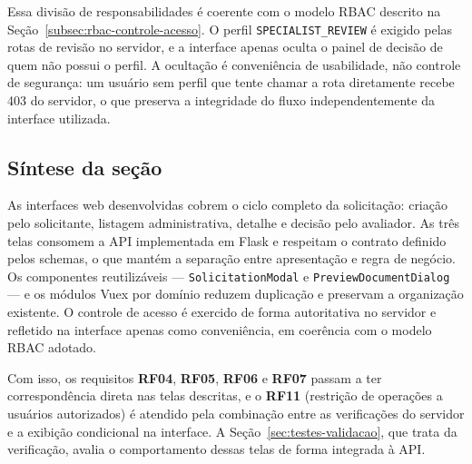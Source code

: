 Essa divisão de responsabilidades é coerente com o modelo RBAC descrito na Seção~\ref{subsec:rbac-controle-acesso}. O perfil
\texttt{SPECIALIST\_REVIEW} é exigido pelas rotas de revisão no servidor, e a interface apenas
oculta o painel de decisão de quem não possui o perfil. A ocultação é conveniência de
usabilidade, não controle de segurança: um usuário sem perfil que tente chamar a rota
diretamente recebe 403 do servidor, o que preserva a integridade do fluxo independentemente da
interface utilizada.

\subsection{Síntese da seção}



As interfaces web desenvolvidas cobrem o ciclo completo da solicitação: criação pelo
solicitante, listagem administrativa, detalhe e decisão pelo avaliador. As três telas consomem a
API implementada em Flask e respeitam o contrato definido pelos schemas, o que mantém a
separação entre apresentação e regra de negócio. Os componentes reutilizáveis ---
\texttt{SolicitationModal} e \texttt{PreviewDocumentDialog} --- e os módulos Vuex por domínio
reduzem duplicação e preservam a organização existente. O controle de acesso é exercido de forma
autoritativa no servidor e refletido na interface apenas como conveniência, em coerência com o
modelo RBAC adotado.

Com isso, os requisitos \textbf{RF04}, \textbf{RF05}, \textbf{RF06} e \textbf{RF07} passam a ter correspondência direta nas
telas descritas, e o \textbf{RF11} (restrição de operações a usuários autorizados) é atendido
pela combinação entre as verificações do servidor e a exibição condicional na interface.
A Seção~\ref{sec:testes-validacao}, que trata da verificação, avalia o comportamento dessas telas de forma
integrada à API.
